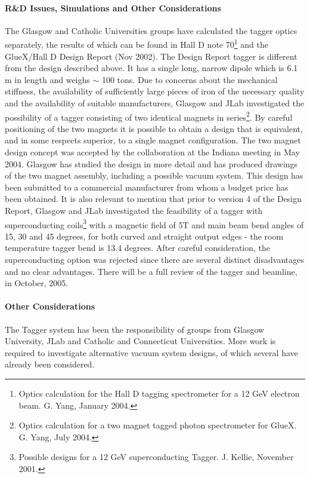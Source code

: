 \documentclass[11pt]{article}
\begin{document}
\paragraph*{R\&D Issues, Simulations and Other Considerations}
The Glasgow  and Catholic Universities groups have calculated the tagger
optics separately, the results of which can be found in Hall D
note 70\footnote{Optics calculation for the Hall D tagging spectrometer
for a 12 GeV electron beam. G. Yang, January 2004.} and the GlueX/Hall D
Design Report (Nov 2002). The Design Report tagger is different from
the design described above. It has a single long, narrow dipole which is
6.1 m in length and weighs $\sim$ 100 tons. Due to concerns about the
mechanical stiffness, the availability of sufficiently large pieces of
iron of the necessary quality and the availability of suitable
manufacturers, Glasgow  and JLab investigated the possibility of a
tagger consisting of two identical magnets in series\footnote{Optics
calculation for a two magnet tagged photon spectrometer for GlueX.
G. Yang, July 2004.}.
By  careful positioning of the two magnets it is possible to obtain a
design that is equivalent, and in some respects superior, to a single
magnet configuration. The two magnet design concept was accepted by
the collaboration at the Indiana meeting in May 2004. Glasgow has studied
the design in more detail and has produced drawings of the two magnet
assembly, including a possible vacuum system. This design has been submitted 
to a commercial manufacturer from whom a budget price has been obtained.
It is also relevant to mention that prior to version 4 of the Design Report, 
Glasgow and JLab investigated the feasibility of a tagger with superconducting 
coils\footnote{Possible designs for a 12 GeV superconducting Tagger. J. Kellie, 
November 2001.} with a magnetic field of 5T and main beam bend angles of 15, 30 
and 45 degrees, for both curved and straight output edges - the room temperature 
tagger bend is 13.4 degrees. After careful consideration, the superconducting 
option was rejected since there are several distinct disadvantages and no 
clear advantages. There will be a full review of the tagger and beamline, in October, 2005.

\paragraph*{Other Considerations}

The Tagger system has been the responsibility of groups from Glasgow 
University, JLab  and Catholic and Connecticut Universities.  More 
work is required to investigate alternative vacuum system designs,
of which several have already been considered. 
\end{document}
